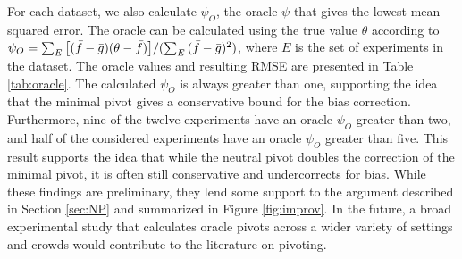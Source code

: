 For each dataset, we also calculate $\psi_O$, the oracle $\psi$ that gives the lowest mean squared error. The oracle can be calculated using the true value $\theta$ according to $\psi_O = \sum_E\big[(\Bar{f}- \Bar{g})(\theta - \Bar{f})\big]/(\sum_E{(\Bar{f}- \Bar{g})^2})$, where $E$ is the set of experiments in the dataset. The oracle values and resulting RMSE are presented in Table \ref{tab:oracle}. The calculated $\psi_O$ is always greater than one, supporting the idea that the minimal pivot gives a conservative bound for the bias correction. Furthermore, nine of the twelve experiments have an oracle $\psi_O$ greater than two, and half of the considered experiments have an oracle $\psi_O$ greater than five. This result supports the idea that while the neutral pivot doubles the correction of the minimal pivot, it is often still conservative and undercorrects for bias. While these findings are preliminary, they lend some support to the argument described in Section \ref{sec:NP} and summarized in Figure \ref{fig:improv}. In the future, a broad experimental study that calculates oracle pivots across a wider variety of settings and crowds would contribute to the literature on pivoting.

